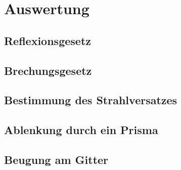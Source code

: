 \section{Auswertung}
\label{sec:Auswertung}



\subsection{Reflexionsgesetz}
\label{sec:Reflexionsgesetz}


\subsection{Brechungsgesetz}
\label{sec:Brechungsgesetz}



\subsection{Bestimmung des Strahlversatzes}
\label{secBestimmung des Strahlversatzes}



\subsection{Ablenkung durch ein Prisma}
\label{sec:Ablenkung durch ein Prisma}



\subsection{Beugung am Gitter}
\label{sec:Beugung am Gitter}

